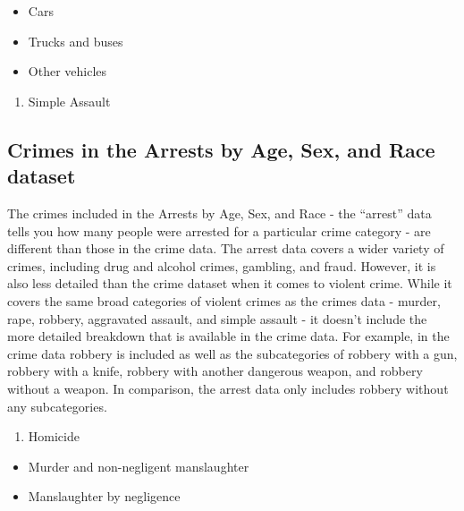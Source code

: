 \documentclass[
  12pt,
  openany]{book}
\providecommand{\tightlist}{%
  \setlength{\itemsep}{0pt}\setlength{\parskip}{0pt}}
\begin{document}
\begin{itemize}
\tightlist
\item
  Cars\\
\item
  Trucks and buses\\
\item
  Other vehicles\\
\end{itemize}

\begin{enumerate}
\def\labelenumi{\arabic{enumi}.}
\setcounter{enumi}{7}
\tightlist
\item
  Simple Assault
\end{enumerate}

\hypertarget{crimes-in-the-arrests-by-age-sex-and-race-dataset}{%
\subsection{Crimes in the Arrests by Age, Sex, and Race dataset}\label{crimes-in-the-arrests-by-age-sex-and-race-dataset}}

The crimes included in the Arrests by Age, Sex, and Race - the ``arrest'' data tells you how many people were arrested for a particular crime category - are different than those in the crime data. The arrest data covers a wider variety of crimes, including drug and alcohol crimes, gambling, and fraud. However, it is also less detailed than the crime dataset when it comes to violent crime. While it covers the same broad categories of violent crimes as the crimes data - murder, rape, robbery, aggravated assault, and simple assault - it doesn't include the more detailed breakdown that is available in the crime data. For example, in the crime data robbery is included as well as the subcategories of robbery with a gun, robbery with a knife, robbery with another dangerous weapon, and robbery without a weapon. In comparison, the arrest data only includes robbery without any subcategories.

\begin{enumerate}
\def\labelenumi{\arabic{enumi}.}
\tightlist
\item
  Homicide
\end{enumerate}

\begin{itemize}
\tightlist
\item
  Murder and non-negligent manslaughter
\item
  Manslaughter by negligence
\end{itemize}
\end{document}
